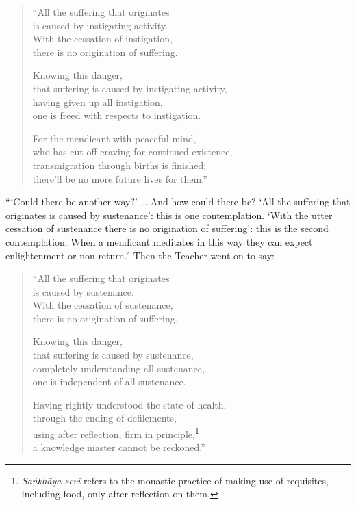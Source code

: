 \documentclass[12pt,openany]{book}%
\begin{document}
\begin{verse}%
“All the suffering that originates \\
is caused by instigating activity. \\
With the cessation of instigation, \\
there is no origination of suffering. 

Knowing this danger, \\
that suffering is caused by instigating activity, \\
having given up all instigation, \\
one is freed with respects to instigation. 

For the mendicant with peaceful mind, \\
who has cut off craving for continued existence, \\
transmigration through births is finished; \\
there’ll be no more future lives for them.” 

%
\end{verse}

“‘Could there be another way?’ … And how could there be? ‘All the suffering that originates is caused by sustenance’: this is one contemplation. ‘With the utter cessation of sustenance there is no origination of suffering’: this is the second contemplation. When a mendicant meditates in this way they can expect enlightenment or non-return.” Then the Teacher went on to say: 

\begin{verse}%
“All the suffering that originates \\
is caused by sustenance. \\
With the cessation of sustenance, \\
there is no origination of suffering. 

Knowing this danger, \\
that suffering is caused by sustenance, \\
completely understanding all sustenance, \\
one is independent of all sustenance. 

Having rightly understood the state of health, \\
through the ending of defilements, \\
using after reflection, firm in principle,\footnote{\textit{\textsanskrit{Saṅkhāya} \textsanskrit{sevī}} refers to the monastic practice of making use of requisites, including food, only after reflection on them. } \\
a knowledge master cannot be reckoned.” 

%
\end{verse}
\end{document}
